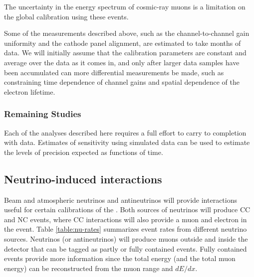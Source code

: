 The uncertainty in the energy spectrum of cosmic-ray muons is a limitation on the global 
calibration using these events.

Some of the measurements described above, such as the channel-to-channel gain uniformity and the
cathode panel alignment, are estimated to take months of data.  We will initially assume that
the calibration parameters are constant and average over the data as it comes in, and only after
larger data samples have been accumulated can more differential measurements be made, such as
constraining time dependence of channel gains and spatial dependence of the electron lifetime.

\subsubsection{Remaining Studies}

Each of the analyses described here requires a full effort to carry to completion with data.
Estimates of sensitivity using simulated data can be used to estimate the levels of precision expected
as functions of time.  

\subsection{Neutrino-induced interactions }\label{sec:nuinduced}


Beam and atmospheric neutrinos and antineutrinos will provide interactions useful for certain calibrations of the .%
Both sources of neutrinos will produce CC and NC events, where CC interactions will also provide a muon and electron in the event. Table \ref{table:nu-rates} summarizes event rates from different neutrino sources. Neutrinos (or antineutrinos) will produce muons outside and inside the detector that can be tagged as partly or fully contained events. Fully contained events provide more information since the total energy (and the total muon energy) can be reconstructed from the muon range and $dE/dx$. 


